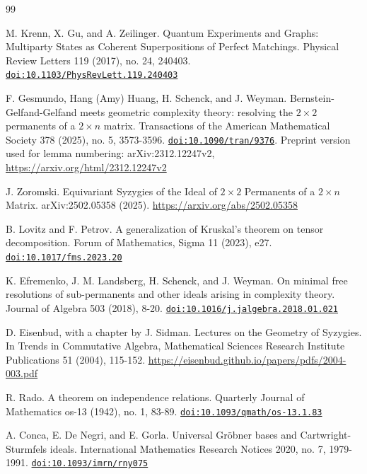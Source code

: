 \documentclass[11pt]{article}
\begin{document}
\begin{thebibliography}{99}\raggedright

M. Krenn, X. Gu, and A. Zeilinger. Quantum Experiments and Graphs: Multiparty States as Coherent Superpositions of Perfect Matchings. Physical Review Letters 119 (2017), no. 24, 240403. \mbox{\href{https://doi.org/10.1103/PhysRevLett.119.240403}{\nolinkurl{doi:10.1103/PhysRevLett.119.240403}}}


F. Gesmundo, Hang (Amy) Huang, H. Schenck, and J. Weyman. Bernstein-Gelfand-Gelfand meets geometric complexity theory: resolving the $2\times2$ permanents of a $2\times n$ matrix. Transactions of the American Mathematical Society 378 (2025), no. 5, 3573-3596. \mbox{\href{https://doi.org/10.1090/tran/9376}{\nolinkurl{doi:10.1090/tran/9376}}}. Preprint version used for lemma numbering: arXiv:2312.12247v2, \url{https://arxiv.org/html/2312.12247v2}


J. Zoromski. Equivariant Syzygies of the Ideal of $2\times2$ Permanents of a $2\times n$ Matrix. arXiv:2502.05358 (2025). \url{https://arxiv.org/abs/2502.05358}


B. Lovitz and F. Petrov. A generalization of Kruskal's theorem on tensor decomposition. Forum of Mathematics, Sigma 11 (2023), e27. \mbox{\href{https://doi.org/10.1017/fms.2023.20}{\nolinkurl{doi:10.1017/fms.2023.20}}}


K. Efremenko, J. M. Landsberg, H. Schenck, and J. Weyman. On minimal free resolutions of sub-permanents and other ideals arising in complexity theory. Journal of Algebra 503 (2018), 8-20. \mbox{\href{https://doi.org/10.1016/j.jalgebra.2018.01.021}{\nolinkurl{doi:10.1016/j.jalgebra.2018.01.021}}}


D. Eisenbud, with a chapter by J. Sidman. Lectures on the Geometry of Syzygies. In Trends in Commutative Algebra, Mathematical Sciences Research Institute Publications 51 (2004), 115-152. \url{https://eisenbud.github.io/papers/pdfs/2004-003.pdf}


R. Rado. A theorem on independence relations. Quarterly Journal of Mathematics os-13 (1942), no. 1, 83-89. \mbox{\href{https://doi.org/10.1093/qmath/os-13.1.83}{\nolinkurl{doi:10.1093/qmath/os-13.1.83}}}


A. Conca, E. De Negri, and E. Gorla. Universal Gröbner bases and Cartwright-Sturmfels ideals. International Mathematics Research Notices 2020, no. 7, 1979-1991. \mbox{\href{https://doi.org/10.1093/imrn/rny075}{\nolinkurl{doi:10.1093/imrn/rny075}}}



\end{thebibliography}
\end{document}
